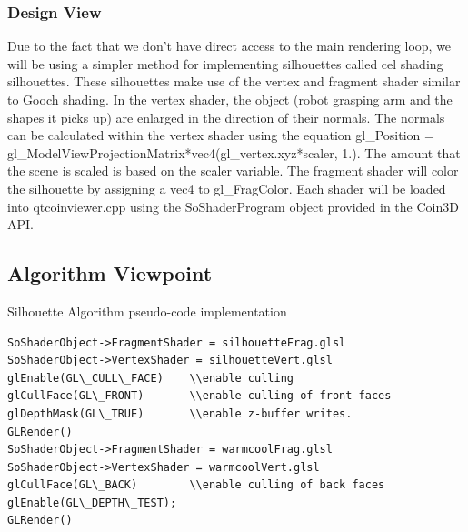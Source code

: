 \documentclass[10pt,journal,compsoc,draftclsnofoot]{IEEEtran}
\begin{document}
\begin{flushleft}
\subsubsection{Design View}
Due to the fact that we don't have direct access to the main rendering loop, we will be using a simpler method for implementing silhouettes called cel shading silhouettes.
These silhouettes make use of the vertex and fragment shader similar to Gooch shading.
In the vertex shader, the object (robot grasping arm and the shapes it picks up) are enlarged in the direction of their normals.
The normals can be calculated within the vertex shader using the equation gl\_Position = gl\_ModelViewProjectionMatrix*vec4(gl\_vertex.xyz*scaler, 1.).
The amount that the scene is scaled is based on the scaler variable.
The fragment shader will color the silhouette by assigning a vec4 to gl\_FragColor.
Each shader will be loaded into qtcoinviewer.cpp using the SoShaderProgram object provided in the Coin3D API.
\newpage

\subsection{Algorithm Viewpoint}
Silhouette Algorithm pseudo-code implementation

\begin{lstlisting}
SoShaderObject->FragmentShader = silhouetteFrag.glsl
SoShaderObject->VertexShader = silhouetteVert.glsl
glEnable(GL\_CULL\_FACE)	\\enable culling
glCullFace(GL\_FRONT)		\\enable culling of front faces
glDepthMask(GL\_TRUE)		\\enable z-buffer writes.
GLRender()
SoShaderObject->FragmentShader = warmcoolFrag.glsl
SoShaderObject->VertexShader = warmcoolVert.glsl
glCullFace(GL\_BACK)		\\enable culling of back faces
glEnable(GL\_DEPTH\_TEST);
GLRender()
\end{lstlisting}


\end{flushleft}
\end{document}
